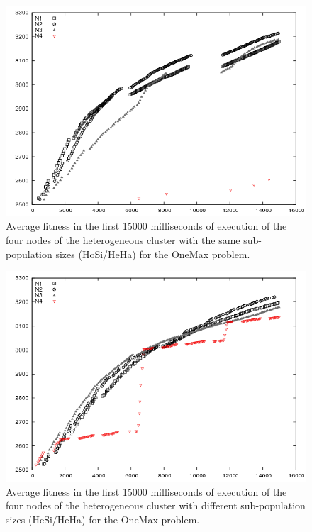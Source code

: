 \begin{figure}
\centering 
\includegraphics[scale =0.4] {gfx/adaptiveresults/generationsONEMAXhomosize.png}
\caption{Average fitness in the first 15000 milliseconds of execution of the four nodes of the heterogeneous cluster with the same sub-population sizes (HoSi/HeHa) for the OneMax problem.}
\label{fig:gensonemaxhomosize}
\end{figure}

\begin{figure}
\centering
\includegraphics[scale =0.4] {gfx/adaptiveresults/generationsONEMAXheterosize.png}
\caption{Average fitness in the first 15000 milliseconds of execution of the four nodes of the heterogeneous cluster with different sub-population sizes (HeSi/HeHa) for the OneMax problem.}
\label{fig:gensonemaxheterosize}
\end{figure}


